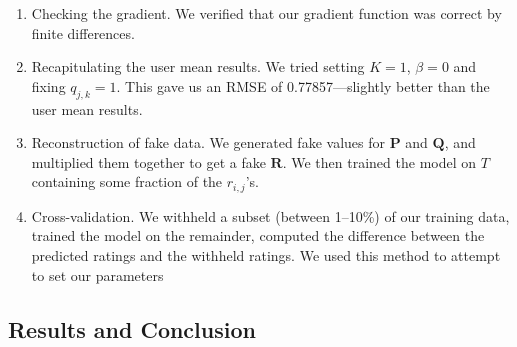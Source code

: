 \documentclass[11pt]{amsart}
\newcommand{\mat}[1]{\mathbf{#1}}
\begin{document}
\begin{enumerate}
\item Checking the gradient. We verified that our gradient function was correct by finite differences.
\item Recapitulating the user mean results. We tried setting $K=1$, $\beta=0$ and fixing $q_{j,k} = 1$. This gave us an RMSE of 0.77857---slightly better than the user mean results.
\item Reconstruction of fake data. We generated fake values for $\mat{P}$ and $\mat{Q}$, and multiplied them together to get a fake $\mat{R}$. We then trained the model on $T$ containing some fraction of the $r_{i,j}$'s.  
\item Cross-validation. We withheld a subset (between 1--10\%) of our training data, trained the model on the remainder, computed the difference between the predicted ratings and the withheld ratings. We used this method to attempt to set our parameters
 
\end{enumerate}

\subsection{Results and Conclusion}




\end{document}

